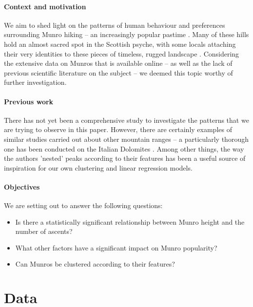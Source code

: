 \documentclass[11pt,a4paper]{article}
\begin{document}
\paragraph{Context and motivation}

We aim to shed light on the patterns of human behaviour and preferences surrounding Munro hiking – an increasingly popular pastime \cite{CSM}. Many of these hills hold an almost sacred spot in the Scottish psyche, with some locals attaching their very identities to these pieces of timeless, rugged landscape \cite{HAE}. Considering the extensive data on Munros that is available online – as well as the lack of previous scientific literature on the subject – we deemed this topic worthy of further investigation.

\paragraph{Previous work}

There has not yet been a comprehensive study to investigate the patterns that we are trying to observe in this paper. However, there are certainly examples of similar studies carried out about other mountain ranges – a particularly thorough one has been conducted on the Italian Dolomites \cite{HitA}. Among other things, the way the authors 'nested' peaks according to their features has been a useful source of inspiration for our own clustering and linear regression models. 

\paragraph{Objectives}

We are setting out to answer the following questions:
\begin{itemize}
    \item Is there a statistically significant relationship between Munro height and the number of ascents?
    \item What other factors have a significant impact on Munro popularity?
    \item Can Munros be clustered according to their features?
\end{itemize}

\newpage
\section{Data}
\end{document}
